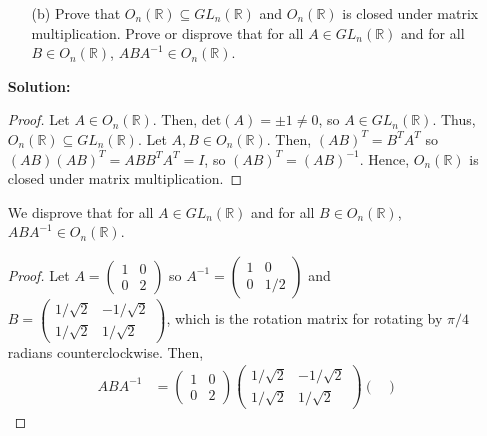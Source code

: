 \documentclass[letterpaper,12pt]{article}
\theoremstyle{definition}
\begin{document}
\begin{enumerate}
    \item[] \begin{enumerate}
        \item[(b)] Prove that $O_n(\mathbb{R}) \subseteq GL_n(\mathbb{R})$ and $O_n(\mathbb{R})$ is closed under matrix multiplication. Prove or disprove that for all $A \in GL_n(\mathbb{R})$ and for all $B \in O_n(\mathbb{R})$, $ABA^{-1} \in O_n(\mathbb{R})$.
    \end{enumerate}
    \begin{mdframed}
        \textbf{Solution:} \begin{proof}
            Let $A\in  O_n(\mathbb{R})$. Then, $\mathrm{det}(A) = \pm 1 \neq 0$, so $A \in GL_n(\mathbb{R})$. Thus, $ O_n(\mathbb{R}) \subseteq GL_n(\mathbb{R})$. Let $A, B \in O_n(\mathbb{R})$. Then, $(AB)^T = B^TA^T$ so $(AB)(AB)^T = AB B^TA^T = I$, so $(AB)^T = (AB)^{-1}$. Hence, $O_n(\mathbb{R})$ is closed under matrix multiplication. 
        \end{proof}
        We disprove that for all $A \in GL_n(\mathbb{R})$ and for all $B \in O_n(\mathbb{R})$, $ABA^{-1} \in O_n(\mathbb{R})$.
        \renewcommand{\proofname}{Disproof}
        \begin{proof}
            Let $A = \begin{pmatrix}
                1 & 0\\ 0 & 2
            \end{pmatrix}$ so $A^{-1} = \begin{pmatrix}
                1 & 0 \\ 0 & 1/2
            \end{pmatrix}$ and $B = \begin{pmatrix}
               1/ \sqrt{2} & -  1/ \sqrt{2} \\   1/ \sqrt{2} &   1/ \sqrt{2}
            \end{pmatrix}$, which is the rotation matrix for rotating by $\pi/4$ radians counterclockwise. Then, 
            \begin{align*}
                ABA^{-1} &= \begin{pmatrix}
                1 & 0\\ 0 & 2
            \end{pmatrix}\begin{pmatrix}
               1/ \sqrt{2} & -  1/ \sqrt{2} \\   1/ \sqrt{2} &   1/ \sqrt{2}
            \end{pmatrix}\begin{pmatrix}

\end{pmatrix}
\end{align*}
\end{proof}
\end{mdframed}
\end{enumerate}
\end{document}
